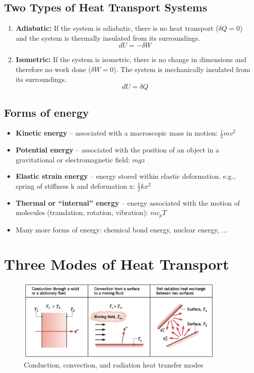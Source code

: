 \documentclass[12pt, a4paper]{article}
\numberwithin{equation}{subsection}
\begin{document}
\subsection{Two Types of Heat Transport Systems}
\begin{enumerate}
    \item \textbf{Adiabatic:} If the system is adiabatic, there is no heat transport ($\delta Q = 0$) and the system is thermally insulated from its surroundings.
    \[ dU = -\delta W \]
    \item \textbf{Isometric:} If the system is isometric, there is no change in dimensions and therefore no work done ($\delta W = 0$). The system is mechanically insulated from its surroundings. 
    \[ dU = \delta Q \]
\end{enumerate}

\subsection{Forms of energy}
\begin{itemize}
    \item \textbf{Kinetic energy} – associated with a macroscopic mass in motion: $\frac{1}{2} mv^{2}$
    \item \textbf{Potential energy} – associated with the position of an object in a gravitational or electromagnetic field: $mgz$
    \item \textbf{Elastic strain energy} – energy stored within elastic deformation. e.g., spring of stiffness k and deformation x: $\frac{1}{2} k x^{2}$
    \item \textbf{Thermal or “internal” energy} – energy associated with the motion of molecules (translation, rotation, vibration): $mc_{p}T$
    \item Many more forms of energy: chemical bond energy, nuclear energy, ...
\end{itemize}

\section{Three Modes of Heat Transport}
\begin{figure}[H]
    \centering
    \includegraphics[width = 0.9\textwidth]{img/modes_of_heat_transport.eps}
    \caption{Conduction, convection, and radiation heat transfer modes}
\end{figure}
\end{document}
